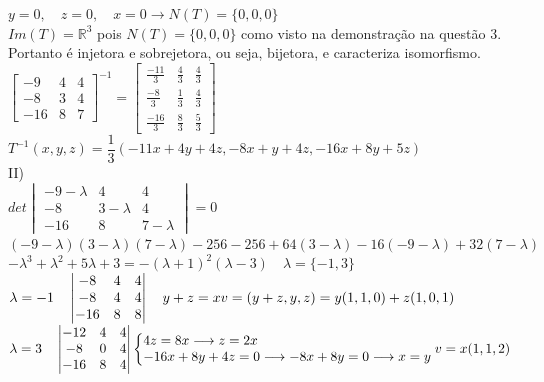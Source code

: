 \documentclass[12pt]{article}
\begin{document}
$y=0,\quad z=0,\quad x=0\longrightarrow N(T)=\lbrace0,0,0\rbrace$\\

$Im(T)=\mathds{R}^{3}$ pois $N(T)=\lbrace0,0,0\rbrace$ como visto na demonstração na questão 3.\\

Portanto é injetora e sobrejetora, ou seja, bijetora, e caracteriza isomorfismo.\\

$\begin{bmatrix}-9&4&4\\-8&3&4\\-16&8&7\end{bmatrix}^{-1}=\begin{bmatrix}\frac{-11}{3}&\frac{4}{3}&\frac{4}{3}\\\frac{-8}{3}&\frac{1}{3}&\frac{4}{3}\\\frac{-16}{3}&\frac{8}{3}&\frac{5}{3}\end{bmatrix}$\\

$T^{-1}(x,y,z)=\dfrac{1}{3}(-11x+4y+4z,-8x+y+4z,-16x+8y+5z)$\\

\noindent II)\\

$det\begin{vmatrix}-9-\lambda&4&4\\-8&3-\lambda&4\\-16&8&7-\lambda\end{vmatrix}=0$\\

$(-9-\lambda)(3-\lambda)(7-\lambda)-256-256+64(3-\lambda)-16(-9-\lambda)+32(7-\lambda)$\\

$-\lambda^{3}+\lambda^{2}+5\lambda+3=-(\lambda+1)^{2}(\lambda-3)\quad\lambda=\lbrace-1,3\rbrace$\\

$\lambda=-1\quad\begin{vmatrix}-8&4&4\\-8&4&4\\-16&8&8\end{vmatrix}\quad y+z=x\hfill v=(y+z,y,z)=y(1,1,0)+z(1,0,1)$\\

$\lambda=3\quad\begin{vmatrix}-12&4&4\\-8&0&4\\-16&8&4\end{vmatrix}\left\{\begin{array}{@{}l@{}}4z=8x\longrightarrow z=2x\\-16x+8y+4z=0\longrightarrow-8x+8y=0\longrightarrow x=y\end{array}\right.\hfill v=x(1,1,2)$
\end{document}
